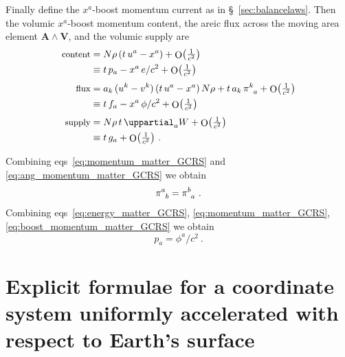\documentclass[a4paper,12pt,%
onecolumn,oneside,article,%
british%
]{memoir}
\theoremstyle{remark}
\theoremstyle{innote}
\newcommand*{\de}{\mathop{}\!\uppartial}%
\DeclareMathOperator{\Ord}{O}%
\renewcommand*{\|}[1][]{\nonscript\:#1\vert\nonscript\:\mathopen{}}
\newcommand*{\sect}{\S}%
\newcommand*{\eqns}{eqs}%
\renewcommand*{\i}{{}\indices}
\newcommand*{\yW}{W}
\newcommand*{\Oc}[1]{\Ord\bigl(\tfrac{1}{c^{#1}}\bigr)}
\begin{document}
Finally define the $x^{a}$-boost momentum current as in \sect~\ref{sec:balancelaws}. Then the volumic $x^{a}$-boost momentum content, the areic flux across the moving area element $\bm{A}\land\bm{V}$, and the volumic supply are
\begin{equation}
  \label{eq:boost_momentum_matter_GCRS}
  \begin{aligned}
    \text{\small content}&= N\rho\, (t\,u^{a} - x^{a}) + \Oc{2}
    \\
    &\equiv t\,p_{a} - x^{a}\,e/c^{2} + \Oc{2}
    \\[\jot]
    \text{\small flux}&=
    \!\begin{multlined}[t][0.8\linewidth]
      a_{k}\,(u^{k}-v^{k}) \, (t\,u^{a} - x^{a}) \,N\rho +
      t\,a_{k}\,\pi\i{^{k}_{a}}  + \Oc{2}
    \end{multlined}
    \\
    &\equiv t\,f_{a} - x^{a}\,\phi/c^{2} + \Oc{2}
    \\[\jot]
    \text{\small supply}&= N\rho\,t\de_{a}\yW+ \Oc{2} 
    \\
    &\equiv t\,g_{a} + \Oc{2} \ .
  \end{aligned}
\end{equation}

Combining \eqns~\eqref{eq:momentum_matter_GCRS} and \eqref{eq:ang_momentum_matter_GCRS} we obtain
\begin{equation}
  \label{eq:stress_sym_GCRS}
  \pi\i{^{a}_{b}} = \pi\i{^{b}_{a}} \ .
\end{equation}
Combining \eqns~\eqref{eq:energy_matter_GCRS}, \eqref{eq:momentum_matter_GCRS}, \eqref{eq:boost_momentum_matter_GCRS} we obtain
\begin{equation}
  \label{eq:equiv_mom_enflux_GCRS}
  p_{a} = \phi^{a}/c^{2} \ .
\end{equation}


\section{Explicit formulae for a coordinate system uniformly accelerated with respect to Earth's surface}
\label{sec:equations_accel}
\end{document}

